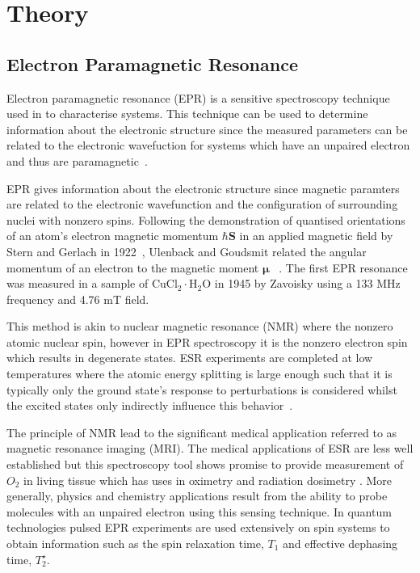 \chapter{Theory}

\section{\label{sec:electronparamagneticresonance}Electron Paramagnetic Resonance}
Electron paramagnetic resonance (EPR) is a sensitive spectroscopy technique used in to characterise systems. This technique can be used to determine information about the electronic structure since the measured parameters can be related to the electronic wavefuction for systems which have an unpaired electron and thus are paramagnetic~\citep{}. 

EPR gives information about the electronic structure since magnetic paramters are related to the electronic wavefunction and the configuration of surrounding nuclei with nonzero spins. 
Following the demonstration of quantised orientations of an atom's electron magnetic momentum $\hbar \textbf{S}$ in an applied magnetic field by Stern and Gerlach in 1922~\citep{10.1007/BF01326983}, Ulenback and Goudsmit related the angular momentum of an electron to the magnetic moment $\bm{\mu}$ ~\citep{10.1007/BF01558878}. The first EPR resonance was measured in a sample of CuCl$_{2}\cdot$H$_{2}$O in 1945 by Zavoisky using a 133 MHz frequency and 4.76 mT field. 


This method is akin to nuclear magnetic resonance (NMR) where the nonzero atomic nuclear spin, however in EPR spectroscopy it is the nonzero electron spin which results in degenerate states. ESR experiments are completed at low temperatures where the atomic energy splitting is large enough such that it is typically only the ground state's response to perturbations is considered whilst the excited states only indirectly influence this behavior~\citep{Stoneham}. 

The principle of NMR lead to the significant medical application referred to as magnetic resonance imaging (MRI). The medical applications of ESR are less well established but this spectroscopy tool shows promise to provide measurement of $O_{2}$ in living tissue which has uses in oximetry and radiation dosimetry \citep{10.1039/c1pc90002a}. More generally, physics and chemistry applications result from the ability to probe molecules with an unpaired electron using this sensing technique. In quantum technologies pulsed EPR experiments are used extensively on spin systems to obtain information such as the spin relaxation time, $T_{1}$ and effective dephasing time, $T_{2}^{\star}$.

